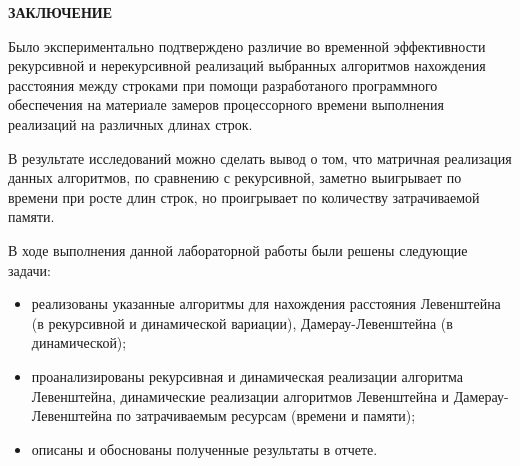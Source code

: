 \begin{center}
    \textbf{ЗАКЛЮЧЕНИЕ}
\end{center}

Было экспериментально подтверждено различие во временной эффективности рекурсивной и нерекурсивной реализаций выбранных алгоритмов нахождения расстояния между строками при помощи разработаного программного обеспечения на материале замеров процессорного времени выполнения реализаций на различных длинах строк. 

В результате исследований можно сделать вывод о том, что матричная реализация данных алгоритмов, по сравнению с рекурсивной, заметно выигрывает по времени при росте длин строк, но проигрывает по количеству затрачиваемой памяти.

\vspace{5mm}

В ходе выполнения данной лабораторной работы были решены следующие задачи:
\begin{itemize}
	\item реализованы указанные алгоритмы для нахождения расстояния Левенштейна (в рекурсивной и динамической вариации), Дамерау-Левенштейна (в динамической);
	\item проанализированы рекурсивная и динамическая реализации алгоритма Левенштейна, динамические реализации алгоритмов Левенштейна и Дамерау-Левенштейна по затрачиваемым ресурсам (времени и памяти);
	\item описаны и обоснованы полученные результаты в отчете.
\end{itemize}